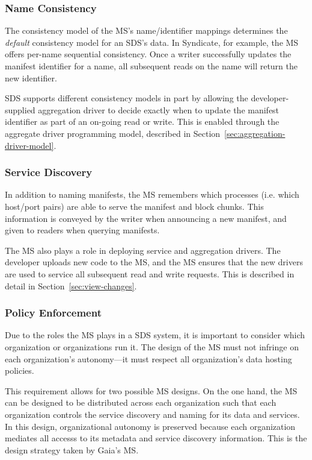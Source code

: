 \subsubsection{Name Consistency}

The consistency model of the MS's name/identifier mappings determines the \emph{default}
consistency model for an SDS's data.
In Syndicate, for example, the MS offers
per-name sequential consistency.  Once a writer successfully updates the manifest
identifier for a name, all subsequent reads on the name will return the new
identifier.

SDS supports different consistency models in part by allowing the
developer-supplied aggregation driver to decide exactly when to update
the manifest identifier as part of an on-going read or write.
This is enabled through the aggregate driver programming model,
described in Section~\ref{sec:aggregation-driver-model}.

\subsubsection{Service Discovery}

In addition to naming manifests, the MS remembers which processes
(i.e. which host/port pairs) are able to serve the manifest and block chunks.
This information is conveyed by the writer when announcing a new manifest,
and given to readers when querying manifests.

The MS also plays a role in deploying service and aggregation drivers.  The
developer uploads new code to the MS, and the MS ensures that the new drivers
are used to service all subsequent read and write requests.  This is described
in detail in Section~\ref{sec:view-changes}.

\subsubsection{Policy Enforcement}

Due to the roles the MS plays in a SDS system, it is important to consider
which organization or organizations run it.  The design of the MS must not infringe on
each organization's autonomy---it must respect all organization's data hosting
policies.

This requirement allows for two possible MS designs.  On the one hand,
the MS can be designed to be distributed across each organization such that each
organization controls the service discovery and naming for its data and
services.  In this design, organizational autonomy is preserved because each
organization mediates all accesss to its metadata and service discovery
information.  This is the design strategy taken by
Gaia's MS.

